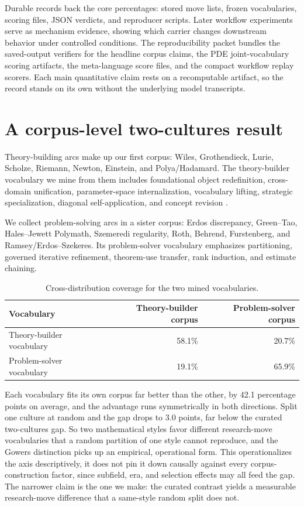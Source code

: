 \documentclass[11pt]{article}
\begin{document}
Durable records back the core percentages: stored move lists, frozen
vocabularies, scoring files, JSON verdicts, and reproducer scripts. Later
workflow experiments serve as mechanism evidence, showing which carrier changes
downstream behavior under controlled conditions. The reproducibility packet
bundles the saved-output verifiers for the headline corpus claims, the PDE
joint-vocabulary scoring artifacts, the meta-language score files, and the
compact workflow replay scorers. Each main quantitative claim rests on a
recomputable artifact, so the record stands on its own without the underlying
model transcripts.

\section{A corpus-level two-cultures result}

Theory-building arcs make up our first corpus: Wiles, Grothendieck, Lurie,
Scholze, Riemann, Newton, Einstein, and Polya/Hadamard. The theory-builder
vocabulary we mine from them includes foundational object redefinition,
cross-domain unification, parameter-space internalization, vocabulary lifting,
strategic specialization, diagonal self-application, and concept revision
\citep{polya1945,lakatos1976}.

We collect problem-solving arcs in a sister corpus: Erdos discrepancy,
Green--Tao, Hales--Jewett Polymath, Szemeredi regularity, Roth, Behrend,
Furstenberg, and Ramsey/Erdos--Szekeres. Its problem-solver vocabulary
emphasizes partitioning, governed iterative refinement, theorem-use transfer,
rank induction, and estimate chaining.

\begin{table}[ht]
\centering
\caption{Cross-distribution coverage for the two mined vocabularies.}
\label{tab:two-cultures}
\begin{tabular}{lrr}
\toprule
Vocabulary & Theory-builder corpus & Problem-solver corpus \\
\midrule
Theory-builder vocabulary & 58.1\% & 20.7\% \\
Problem-solver vocabulary & 19.1\% & 65.9\% \\
\bottomrule
\end{tabular}
\end{table}

Each vocabulary fits its own corpus far better than the other, by 42.1
percentage points on average, and the advantage runs symmetrically in both
directions. Split one culture at random and the gap drops to 3.0 points, far
below the curated two-cultures gap. So two mathematical styles favor different
research-move vocabularies that a random partition of one style cannot reproduce,
and the Gowers distinction picks up an empirical, operational form. This
operationalizes the axis descriptively, it does not pin it down causally against
every corpus-construction factor, since subfield, era, and selection effects may
all feed the gap. The narrower claim is the one we make: the curated contrast
yields a measurable research-move difference that a same-style random split does
not.
\end{document}
